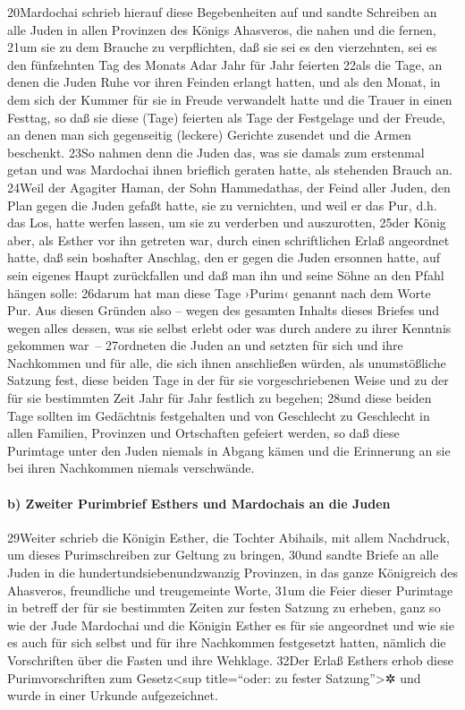 20Mardochai schrieb hierauf diese Begebenheiten auf und sandte Schreiben
an alle Juden in allen Provinzen des Königs Ahasveros, die nahen und die
fernen, 21um sie zu dem Brauche zu verpflichten, daß sie sei es den
vierzehnten, sei es den fünfzehnten Tag des Monats Adar Jahr für Jahr
feierten 22als die Tage, an denen die Juden Ruhe vor ihren Feinden
erlangt hatten, und als den Monat, in dem sich der Kummer für sie in
Freude verwandelt hatte und die Trauer in einen Festtag, so daß sie
diese (Tage) feierten als Tage der Festgelage und der Freude, an denen
man sich gegenseitig (leckere) Gerichte zusendet und die Armen
beschenkt. 23So nahmen denn die Juden das, was sie damals zum erstenmal
getan und was Mardochai ihnen brieflich geraten hatte, als stehenden
Brauch an. 24Weil der Agagiter Haman, der Sohn Hammedathas, der Feind
aller Juden, den Plan gegen die Juden gefaßt hatte, sie zu vernichten,
und weil er das Pur, d.h. das Los, hatte werfen lassen, um sie zu
verderben und auszurotten, 25der König aber, als Esther vor ihn getreten
war, durch einen schriftlichen Erlaß angeordnet hatte, daß sein
boshafter Anschlag, den er gegen die Juden ersonnen hatte, auf sein
eigenes Haupt zurückfallen und daß man ihn und seine Söhne an den Pfahl
hängen solle: 26darum hat man diese Tage ›Purim‹ genannt nach dem Worte
Pur. Aus diesen Gründen also -- wegen des gesamten Inhalts dieses
Briefes und wegen alles dessen, was sie selbst erlebt oder was durch
andere zu ihrer Kenntnis gekommen war~-- 27ordneten die Juden an und
setzten für sich und ihre Nachkommen und für alle, die sich ihnen
anschließen würden, als unumstößliche Satzung fest, diese beiden Tage in
der für sie vorgeschriebenen Weise und zu der für sie bestimmten Zeit
Jahr für Jahr festlich zu begehen; 28und diese beiden Tage sollten im
Gedächtnis festgehalten und von Geschlecht zu Geschlecht in allen
Familien, Provinzen und Ortschaften gefeiert werden, so daß diese
Purimtage unter den Juden niemals in Abgang kämen und die Erinnerung an
sie bei ihren Nachkommen niemals verschwände.

\hypertarget{b-zweiter-purimbrief-esthers-und-mardochais-an-die-juden}{%
\paragraph{b) Zweiter Purimbrief Esthers und Mardochais an die
Juden}\label{b-zweiter-purimbrief-esthers-und-mardochais-an-die-juden}}

29Weiter schrieb die Königin Esther, die Tochter Abihails, mit allem
Nachdruck, um dieses Purimschreiben zur Geltung zu bringen, 30und sandte
Briefe an alle Juden in die hundertundsiebenundzwanzig Provinzen, in das
ganze Königreich des Ahasveros, freundliche und treugemeinte Worte, 31um
die Feier dieser Purimtage in betreff der für sie bestimmten Zeiten zur
festen Satzung zu erheben, ganz so wie der Jude Mardochai und die
Königin Esther es für sie angeordnet und wie sie es auch für sich selbst
und für ihre Nachkommen festgesetzt hatten, nämlich die Vorschriften
über die Fasten und ihre Wehklage. 32Der Erlaß Esthers erhob diese
Purimvorschriften zum Gesetz\textless sup title=``oder: zu fester
Satzung''\textgreater✲ und wurde in einer Urkunde aufgezeichnet.

